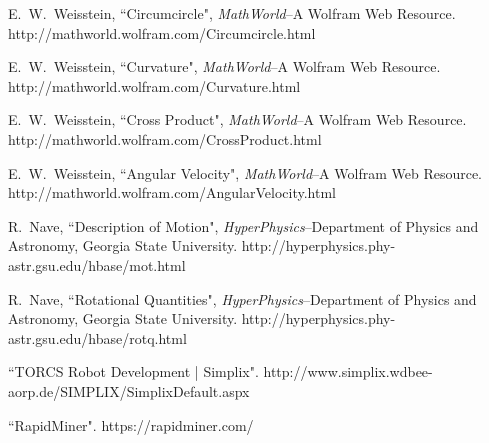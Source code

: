 \documentclass[conference]{IEEEtran}
\begin{document}
\begin{thebibliography}{18}
E.~W.~Weisstein, ``Circumcircle", \emph{MathWorld}--A Wolfram Web Resource. http://mathworld.wolfram.com/Circumcircle.html

E.~W.~Weisstein, ``Curvature", \emph{MathWorld}--A Wolfram Web Resource. http://mathworld.wolfram.com/Curvature.html

E.~W.~Weisstein, ``Cross Product", \emph{MathWorld}--A Wolfram Web Resource. http://mathworld.wolfram.com/CrossProduct.html

E.~W.~Weisstein, ``Angular Velocity", \emph{MathWorld}--A Wolfram Web Resource. http://mathworld.wolfram.com/AngularVelocity.html

R.~Nave, ``Description of Motion", \emph{HyperPhysics}--Department of Physics and Astronomy, Georgia State University. http://hyperphysics.phy-astr.gsu.edu/hbase/mot.html

R.~Nave, ``Rotational Quantities", \emph{HyperPhysics}--Department of Physics and Astronomy, Georgia State University. http://hyperphysics.phy-astr.gsu.edu/hbase/rotq.html

``TORCS Robot Development | Simplix". http://www.simplix.wdbee-aorp.de/SIMPLIX/SimplixDefault.aspx

``RapidMiner". https://rapidminer.com/
\end{thebibliography}

\newpage
\end{document}
